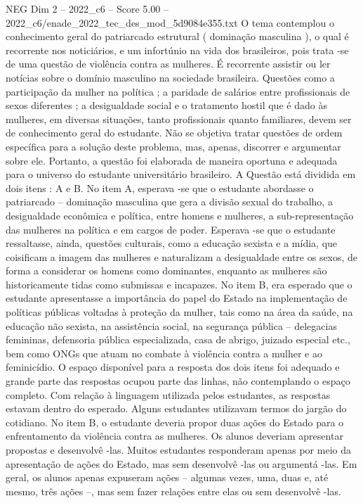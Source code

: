 \begin{textsample}{NEG Dim 2 – 2022\_c6 – Score 5.00 – 2022\_c6/enade\_2022\_tec\_des\_mod\_5d9084e355.txt}
O tema contemplou o conhecimento geral do patriarcado estrutural ( dominação masculina ), o qual é recorrente nos noticiários, e um infortúnio na vida dos brasileiros, pois trata -se de uma questão de violência contra as mulheres.
É recorrente assistir ou ler notícias sobre o domínio masculino na sociedade brasileira.
Questões como a participação da mulher na política ; a paridade de salários entre profissionais de sexos diferentes ; a desigualdade social e o tratamento hostil que é dado às mulheres, em diversas situações, tanto profissionais quanto familiares, devem ser de conhecimento geral do estudante.
Não se objetiva tratar questões de ordem específica para a solução deste problema, mas, apenas, discorrer e argumentar sobre ele.
Portanto, a questão foi elaborada de maneira oportuna e adequada para o universo do estudante universitário brasileiro.
A Questão está dividida em dois itens : A e B.
No item A, esperava -se que o estudante abordasse o patriarcado – dominação masculina que gera a divisão sexual do trabalho, a desigualdade econômica e política, entre homens e mulheres, a sub-representação das mulheres na política e em cargos de poder.
Esperava -se que o estudante ressaltasse, ainda, questões culturais, como a educação sexista e a mídia, que coisificam a imagem das mulheres e naturalizam a desigualdade entre os sexos, de forma a considerar os homens como dominantes, enquanto as mulheres são historicamente tidas como submissas e incapazes.
No item B, era esperado que o estudante apresentasse a importância do papel do Estado na implementação de políticas públicas voltadas à proteção da mulher, tais como na área da saúde, na educação não sexista, na assistência social, na segurança pública – delegacias femininas, defensoria pública especializada, casa de abrigo, juizado especial etc., bem como ONGs que atuam no combate à violência contra a mulher e ao feminicídio.
O espaço disponível para a resposta dos dois itens foi adequado e grande parte das respostas ocupou parte das linhas, não contemplando o espaço completo.
Com relação à linguagem utilizada pelos estudantes, as respostas estavam dentro do esperado.
Alguns estudantes utilizavam termos do jargão do cotidiano.
No item B, o estudante deveria propor duas ações do Estado para o enfrentamento da violência contra as mulheres.
Os alunos deveriam apresentar propostas e desenvolvê -las.
Muitos estudantes responderam apenas por meio da apresentação de ações do Estado, mas sem desenvolvê -las ou argumentá -las.
Em geral, os alunos apenas expuseram ações – algumas vezes, uma, duas e, até mesmo, três ações –, mas sem fazer relações entre elas ou sem desenvolvê -las.

\end{textsample}
